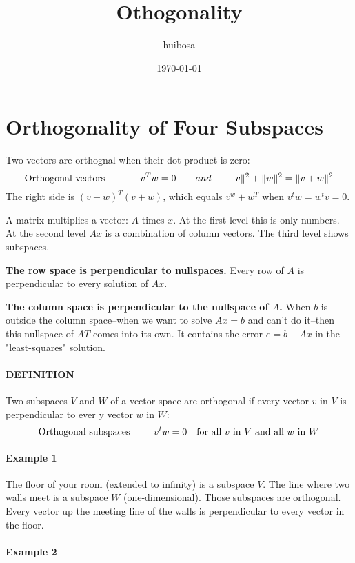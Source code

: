 \documentclass{article}
\title{Othogonality}
\author{huibosa}
\date{\today}
\begin{document}
\maketitle
\tableofcontents
\newpage

\section{Orthogonality of Four Subspaces}

Two vectors are orthognal when their dot product is zero:
\[\parbox{12em}{Orthogonal vectors}
  v^Tw=0 \qquad and \qquad
  \|v\|^{2}+\|w\|^{2}=\|v+w\|^{2}
\]
The right side is $(v+w)^{T}(v+w)$, which equals $v^w+w^T$ when $v^tw=w^tv=0$.

A matrix multiplies a vector: $A$ times $x$. At the first level this is only numbers. At
the second level $Ax$ is a combination of column vectors. The third level shows subspaces.

\textbf{The row space is perpendicular to nullspaces.} Every row of $A$ is perpendicular to every solution of $Ax$.

\textbf{The column space is perpendicular to the nullspace of $A$.} When $b$ is outside the column space--when we want to solve $Ax=b$ and can't do it--then this nullspace of $AT$ comes into its own. It contains the error $e=b-Ax$ in the "least-squares" solution.

\paragraph{DEFINITION}

Two subspaces $V$ and $W$ of a vector space are orthogonal if every vector $v$ in $V$ is perpendicular to ever y vector $w$ in $W$:
\[\parbox{12em}{Orthogonal subspaces}
  v^tw=0 \quad \text{for all $v$ in $V$ and all $w$ in $W$}
\]

\paragraph{Example 1}

The floor of your room (extended to infinity) is a subspace $V$. The line where two walls meet is a subspace $W$ (one-dimensional). Those subspaces are orthogonal. Every vector up the meeting line of the walls is perpendicular to every vector in the floor.

\paragraph{Example 2}
\end{document}
